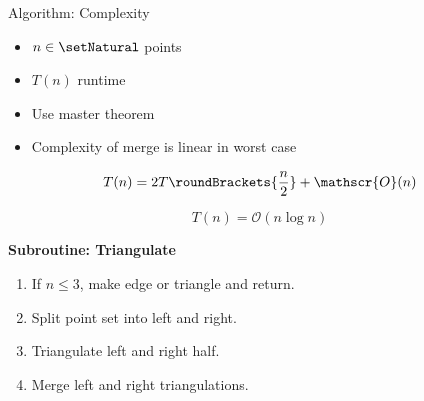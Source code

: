 \documentclass[aspectratio=169,fleqn]{beamer}
\begin{document}
  \begin{frame}{Algorithm: Complexity}
    \onslide<+->
    \begin{minipage}[c]{0.4\textwidth}
      \begin{itemize}
        \item<+-> $n\in\setNatural$ points
        \item<+-> $T(n)$ runtime
        \item<+-> Use master theorem
        \item<+-> Complexity of merge is linear in worst case
      \end{itemize}
      \medskip
      \onslide<+->
      \[
        T(n) = 2 T\roundBrackets{\frac{n}{2}} + \mathscr{O}(n)
      \]
      \onslide<+->
      \begin{mybox}
        \[
          T(n) = \mathscr{O}(n\log n)
        \]
      \end{mybox}
    \end{minipage}
    \hfill
    \begin{minipage}[c]{0.49\textwidth}
      \begin{mybox}
        \textbf{Subroutine: Triangulate}
        \begin{enumerate}
          \item If $n\leq 3$, make edge or triangle and return.
          \item Split point set into left and right.
          \item Triangulate left and right half.
          \item Merge left and right triangulations.
        \end{enumerate}
      \end{mybox}%
    \end{minipage}
  \end{frame}
\end{document}
